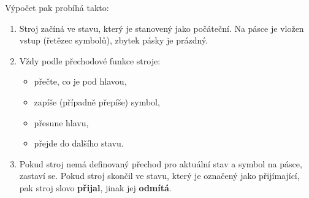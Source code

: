 Výpočet pak probíhá takto:
\begin{enumerate}
    \item Stroj začíná ve stavu, který je stanovený jako počáteční. Na pásce je vložen vstup (řetězec symbolů), zbytek pásky je prázdný.
    \item Vždy podle přechodové funkce stroje:
    \begin{itemize}
        \item přečte, co je pod hlavou,
        \item zapíše (případně přepíše) symbol,
        \item přesune hlavu,
        \item přejde do dalšího stavu.
    \end{itemize}
    \item Pokud stroj nemá definovaný přechod pro aktuální stav a symbol na pásce, zastaví se. Pokud stroj skončil ve stavu, který je označený jako přijímající, pak stroj slovo \textbf{přijal}, jinak jej \textbf{odmítá}.
\end{enumerate}
